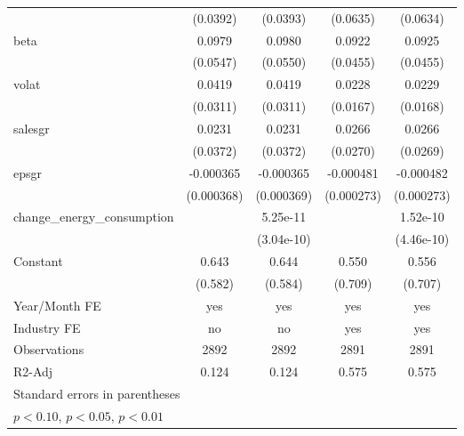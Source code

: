 \begin{table}[htbp]
\begin{tabular}{l*{4}{c}}
                    &    (0.0392)         &    (0.0393)         &    (0.0635)         &    (0.0634)         \\
[1em]
beta                &      0.0979\sym{*}  &      0.0980\sym{*}  &      0.0922\sym{**} &      0.0925\sym{**} \\
                    &    (0.0547)         &    (0.0550)         &    (0.0455)         &    (0.0455)         \\
[1em]
volat               &      0.0419         &      0.0419         &      0.0228         &      0.0229         \\
                    &    (0.0311)         &    (0.0311)         &    (0.0167)         &    (0.0168)         \\
[1em]
salesgr             &      0.0231         &      0.0231         &      0.0266         &      0.0266         \\
                    &    (0.0372)         &    (0.0372)         &    (0.0270)         &    (0.0269)         \\
[1em]
epsgr               &   -0.000365         &   -0.000365         &   -0.000481\sym{*}  &   -0.000482\sym{*}  \\
                    &  (0.000368)         &  (0.000369)         &  (0.000273)         &  (0.000273)         \\
[1em]
change\_energy\_consumption&                     &    5.25e-11         &                     &    1.52e-10         \\
                    &                     &  (3.04e-10)         &                     &  (4.46e-10)         \\
[1em]
Constant            &       0.643         &       0.644         &       0.550         &       0.556         \\
                    &     (0.582)         &     (0.584)         &     (0.709)         &     (0.707)         \\
\hline
Year/Month FE       &         yes         &         yes         &         yes         &         yes         \\
Industry FE         &          no         &          no         &         yes         &         yes         \\
Observations        &        2892         &        2892         &        2891         &        2891         \\
R2-Adj              &       0.124         &       0.124         &       0.575         &       0.575         \\
\hline\hline
\multicolumn{5}{l}{\footnotesize Standard errors in parentheses}\\
\multicolumn{5}{l}{\footnotesize \sym{*} \(p<0.10\), \sym{**} \(p<0.05\), \sym{***} \(p<0.01\)}\\
\end{tabular}
\end{table}
